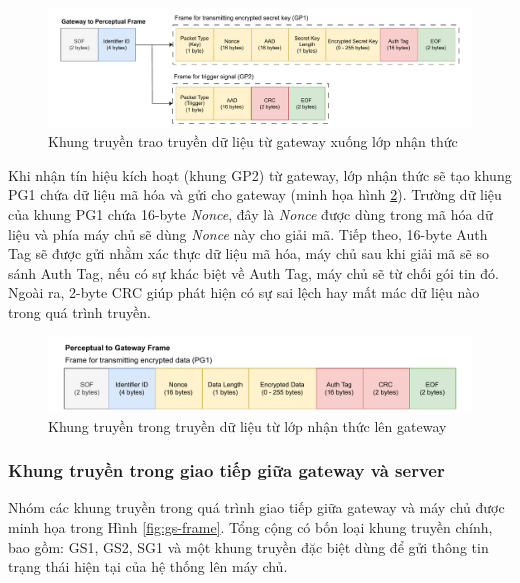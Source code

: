 \begin{figure}[h]
    \centering
    \includegraphics[width=1\linewidth]{gp-frame.pdf}
    \caption{Khung truyền trao truyền dữ liệu từ gateway xuống lớp nhận thức}
    \label{fig:gp}
\end{figure}

Khi nhận tín hiệu kích hoạt (khung GP2) từ gateway, lớp nhận thức sẽ tạo khung PG1 chứa dữ liệu mã hóa và gửi cho gateway (minh họa hình \ref{fig:pg-frame}). Trường dữ liệu của khung PG1 chứa 16-byte \textit{Nonce}, đây là \textit{Nonce} được dùng trong mã hóa dữ liệu và phía máy chủ sẽ dùng \textit{Nonce} này cho giải mã. Tiếp theo, 16-byte Auth Tag sẽ được gửi nhằm xác thực dữ liệu mã hóa, máy chủ sau khi giải mã sẽ so sánh Auth Tag, nếu có sự khác biệt về Auth Tag, máy chủ sẽ từ chối gói tin đó. Ngoài ra, 2-byte CRC giúp phát hiện có sự sai lệch hay mất mác dữ liệu nào trong quá trình truyền.

\begin{figure}[H]
    \centering
    \includegraphics[width=0.9\linewidth]{pg-frame.pdf}
    \caption{Khung truyền trong truyền dữ liệu từ lớp nhận thức lên gateway}
    \label{fig:pg-frame}
\end{figure}

\subsubsection{Khung truyền trong giao tiếp giữa gateway và server}
\label{sec:gs}
Nhóm các khung truyền trong quá trình giao tiếp giữa gateway và máy chủ được minh họa trong Hình \ref{fig:gs-frame}. Tổng cộng có bốn loại khung truyền chính, bao gồm: GS1, GS2, SG1 và một khung truyền đặc biệt dùng để gửi thông tin trạng thái hiện tại của hệ thống lên máy chủ.

